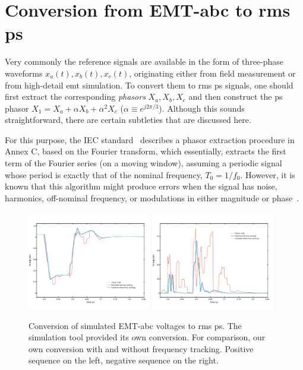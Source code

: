 \documentclass[11pt, a4paper, twoside, titlepage]{article}
\begin{document}
\section{Conversion from EMT-abc to \ac{rms} \ac{ps}}

Very commonly the reference signals are available in the form of three-phase
waveforms $x_a(t), x_b(t), x_c(t)$, originating either from field measurement or
from high-detail \ac{emt} simulation. To convert them to \ac{rms} \ac{ps}
signals, one should first extract the corresponding \emph{phasors} $X_a, X_b,
X_c$ and then construct the \ac{ps} phasor $X_1 = X_a + \alpha X_b + \alpha^2
X_c$ ($\alpha \equiv e^{j2\pi/3}$). Although this sounds straightforward, there
are certain subtleties that are discussed here.

For this purpose, the IEC standard~\cite{iec27-2} describes a phasor extraction
procedure in Annex C, based on the Fourier transform, which essentially,
extracts the first term of the Fourier series (on a moving window), assuming a
periodic signal whose period is exactly that of the nominal frequency,
$T_0=1/f_0$. However, it is known that this algorithm might produce errors when
the signal has noise, harmonics, off-nominal frequency, or modulations in either
magnitude or phase~\cite{PhadkeThorp17}.

\begin{figure}[t]
\centering
\includegraphics[width=0.48\textwidth]{figs/Fig_emt2rms_exampleV_PS.pdf}
\hfill
\includegraphics[width=0.48\textwidth]{figs/Fig_emt2rms_exampleV_NS.pdf}
\caption{Conversion of simulated EMT-abc voltages to \ac{rms} \ac{ps}. The
  simulation tool provided its own conversion. For comparison, our own
  conversion with and without frequency tracking. Positive sequence on the left,
  negative sequence on the right.}
\label{fig:emt2rmsV}
\end{figure}
\end{document}
